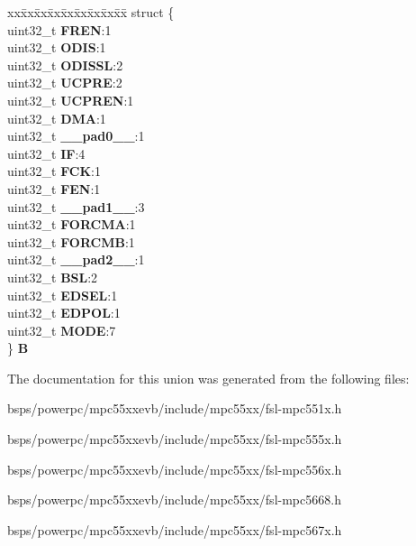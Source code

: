 \begin{DoxyCompactItemize}
\begin{tabbing}
\end{tabbing}\item 
\mbox{\label{unionEMIOS__tag_1_1EMIOS__CH__tag_1_1EMIOS__CCR__tag_aa8dcd9d1d469946ba4024f65755782e0}} 
\begin{tabbing}
xx\=xx\=xx\=xx\=xx\=xx\=xx\=xx\=xx\=\kill
struct \{\\
\>uint32\_t {\bfseries FREN}:1\\
\>uint32\_t {\bfseries ODIS}:1\\
\>uint32\_t {\bfseries ODISSL}:2\\
\>uint32\_t {\bfseries UCPRE}:2\\
\>uint32\_t {\bfseries UCPREN}:1\\
\>uint32\_t {\bfseries DMA}:1\\
\>uint32\_t {\bfseries \_\_pad0\_\_}:1\\
\>uint32\_t {\bfseries IF}:4\\
\>uint32\_t {\bfseries FCK}:1\\
\>uint32\_t {\bfseries FEN}:1\\
\>uint32\_t {\bfseries \_\_pad1\_\_}:3\\
\>uint32\_t {\bfseries FORCMA}:1\\
\>uint32\_t {\bfseries FORCMB}:1\\
\>uint32\_t {\bfseries \_\_pad2\_\_}:1\\
\>uint32\_t {\bfseries BSL}:2\\
\>uint32\_t {\bfseries EDSEL}:1\\
\>uint32\_t {\bfseries EDPOL}:1\\
\>uint32\_t {\bfseries MODE}:7\\
\} {\bfseries B}\\

\end{tabbing}\end{DoxyCompactItemize}


The documentation for this union was generated from the following files\+:\begin{DoxyCompactItemize}
\item 
bsps/powerpc/mpc55xxevb/include/mpc55xx/fsl-\/mpc551x.\+h\item 
bsps/powerpc/mpc55xxevb/include/mpc55xx/fsl-\/mpc555x.\+h\item 
bsps/powerpc/mpc55xxevb/include/mpc55xx/fsl-\/mpc556x.\+h\item 
bsps/powerpc/mpc55xxevb/include/mpc55xx/fsl-\/mpc5668.\+h\item 
bsps/powerpc/mpc55xxevb/include/mpc55xx/fsl-\/mpc567x.\+h\end{DoxyCompactItemize}
